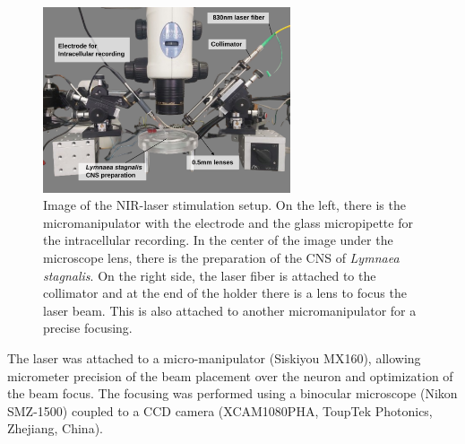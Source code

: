 \begin{figure}[htb!]
	\centering
	\includegraphics[width=0.65\textwidth]{img/methods/laser-setup_labels.png}
	\caption{Image of the NIR-laser stimulation setup. On the left, there is the micromanipulator with the electrode and the glass micropipette for the intracellular recording. In the center of the image under the microscope lens, there is the preparation of the CNS of \textit{Lymnaea stagnalis}. On the right side, the laser fiber is attached to the collimator and at the end of the holder there is a lens to focus the laser beam. This is also attached to another micromanipulator for a precise focusing.}
	\label{fig:laser setup}
\end{figure}

The laser was attached to a micro-manipulator (Siskiyou MX160), allowing micrometer precision of the beam placement over the neuron and optimization of the beam focus. The focusing was performed using a binocular microscope (Nikon SMZ-1500) coupled to a CCD camera (XCAM1080PHA, ToupTek Photonics, Zhejiang, China).
